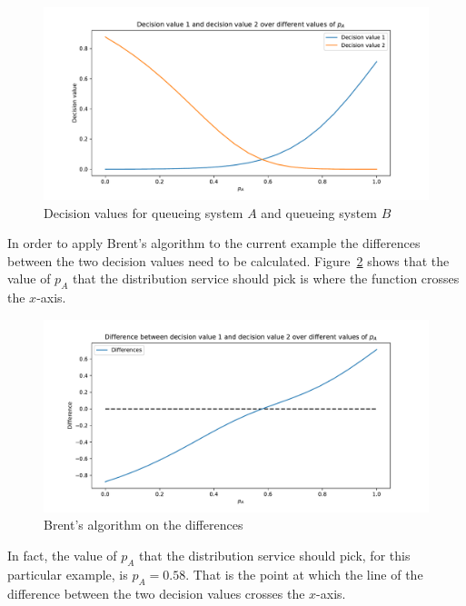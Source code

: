\begin{figure}[H]
    \centering
    \includegraphics[width=\textwidth]{chapters/04_game_theoretic_model/img/brents_method/brent_method_example.pdf}
    \caption{Decision values for queueing system \(A\) and queueing system \(B\)}
    \label{fig:brent_method_example}
\end{figure}

In order to apply Brent's algorithm to the current example the differences
between the two decision values need to be calculated.
Figure~\ref{fig:brent_method_diffs} shows that the value of \(p_A\) that the
distribution service should pick is where the function crosses the \(x\)-axis.

\begin{figure}[H]
    \centering
    \includegraphics[width=\textwidth]{chapters/04_game_theoretic_model/img/brents_method/brent_method_diffs.pdf}
    \caption{Brent's algorithm on the differences}
    \label{fig:brent_method_diffs}
\end{figure}

In fact, the value of \(p_A\) that the distribution service should pick, for
this particular example, is \(p_A = 0.58\).
That is the point at which the line of the difference between the two decision
values crosses the \(x\)-axis.

